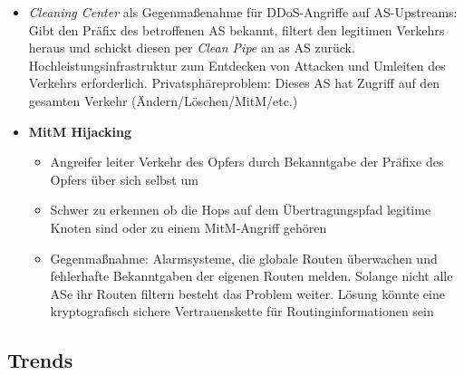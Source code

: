 \begin{itemize}
\begin{itemize}
	\end{itemize}
	\item \textit{Cleaning Center} als Gegenmaßenahme für DDoS-Angriffe auf AS-Upstreams: Gibt den Präfix des betroffenen AS bekannt, filtert den legitimen Verkehrs heraus und schickt diesen per \textit{Clean Pipe} an as AS zurück. Hochleistungsinfrastruktur zum Entdecken von Attacken und Umleiten des Verkehrs erforderlich. Privatsphäreproblem: Dieses AS hat Zugriff auf den gesamten Verkehr (Ändern/Löschen/MitM/etc.)
	\item \textbf{MitM Hijacking}
	\begin{itemize}
		\item Angreifer leiter Verkehr des Opfers durch Bekanntgabe der Präfixe des Opfers über sich selbst um
		\item Schwer zu erkennen ob die Hops auf dem Übertragungspfad legitime Knoten sind oder zu einem MitM-Angriff gehören
		\item Gegenmaßnahme: Alarmsysteme, die globale Routen überwachen und fehlerhafte Bekanntgaben der eigenen Routen melden. Solange nicht alle ASe ihr Routen filtern besteht das Problem weiter. Lösung könnte eine kryptografisch sichere Vertrauenskette für Routinginformationen sein
	\end{itemize}
\end{itemize}


\subsection{Trends}

